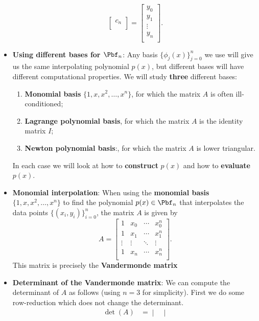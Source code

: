 \documentclass{report}
\begin{document}
\begin{itemize}
$$\begin{bmatrix}
c_n\\
\end{bmatrix}
=
\begin{bmatrix}
y_0\\
y_1\\
\vdots\\
y_n\\
\end{bmatrix}.
$$
\item \textbf{Using different bases for $\Pbf_n$}:
    Any basis $\big\{\phi_j(x)\big\}_{j=0}^n$ we use will give us the same interpolating polynomial $p(x)$, but different bases will have different computational properties.
    \bigbreak \noindent 
    We will study \textbf{three} different bases:
    \begin{enumerate}
        \item \textbf{Monomial basis} $\{1, x, x^2, \ldots, x^n\}$, for which the matrix $A$ is often ill-conditioned;
        \item \textbf{Lagrange polynomial basis}, for which the matrix $A$ is the identity matrix $I$;
        \item \textbf{Newton polynomial basis}:, for which the matrix $A$ is lower triangular.
    \end{enumerate}
    In each case we will look at how to \textbf{construct} $p(x)$ and how to \textbf{evaluate} $p(x)$.
\item \textbf{Monomial interpolation}:
    When using the \textbf{monomial basis} $\{1, x, x^2, \ldots, x^n\}$ to find the polynomial $p(x) \in \Pbf_n$ that interpolates the data points $\{(x_i,y_i)\}_{i=0}^n$, the matrix $A$ is given by
    $$
    A = 
    \begin{bmatrix}
        1 & x_0 & \cdots & x_0^n\\
        1 & x_1 & \cdots & x_1^n\\
        \vdots & \vdots & \ddots & \vdots\\
        1 & x_n & \cdots & x_n^n\\
    \end{bmatrix}.
    $$
    \bigbreak \noindent 
    This matrix is precisely the \textbf{Vandermonde matrix}
\item \textbf{Determinant of the Vandermonde matrix}:
    We can compute the determinant of $A$ as follows (using $n=3$ for simplicity).
    \bigbreak \noindent 
    First we do some row-reduction which does not change the determinant.
    \begin{align*}
        \det(A)
& = 
\begin{vmatrix}

\end{vmatrix}
\end{align*}
\end{itemize}
\end{document}
